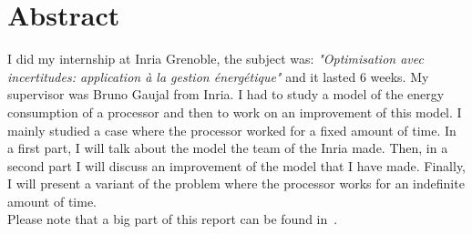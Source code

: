 \documentclass[
10pt, %
a4paper, %
oneside, %
headinclude,footinclude, %
BCOR5mm, %
]{scrartcl}
\title{\normalfont\spacedallcaps{Internship report}} %
\author{\spacedlowsmallcaps{Vincent RÉBISCOUL}} %
\date{} %
\begin{document}

\renewcommand{\sectionmark}[1]{\markright{\spacedlowsmallcaps{#1}}} %
\lehead{\mbox{\llap{\small\thepage\kern1em\color{halfgray} \vline}\color{halfgray}\hspace{0.5em}\rightmark\hfil}} %

\pagestyle{scrheadings} %


\maketitle %

\setcounter{tocdepth}{2} %

\tableofcontents %
\section*{Abstract}
I did my internship at Inria Grenoble,  the subject was:
\textit{"Optimisation avec incertitudes: application à la gestion
  énergétique"} and it lasted 6 weeks. My supervisor was Bruno Gaujal
from  Inria. I had to study a model of the energy consumption of a
processor and then
to work on an improvement of this model. I mainly studied a case where
the processor worked for a fixed amount of time. In a first part, I
will talk about the model the team of the Inria made. Then, in a second
part I will discuss an improvement of the model that I have
made. Finally, I will present a variant of the
problem where the processor works for an indefinite amount of time.\\

Please note that a big part of this report can be found in~\cite{Gaujal}.


\newpage %
\end{document}
